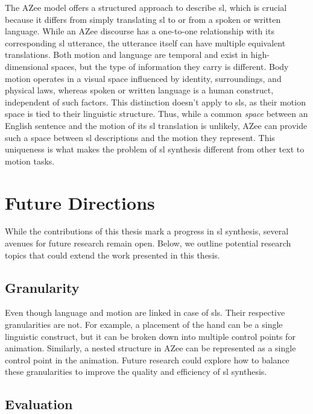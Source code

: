 \documentclass[../../main.tex]{subfiles}
\begin{document}
The AZee model offers a structured approach to describe \gls{sl}, which is crucial because it differs from simply translating \gls{sl} to or from a spoken or written language. While an AZee discourse has a one-to-one relationship with its corresponding \gls{sl} utterance, the utterance itself can have multiple equivalent translations. Both motion and language are temporal and exist in high-dimensional spaces, but the type of information they carry is different. Body motion operates in a visual space influenced by identity, surroundings, and physical laws, whereas spoken or written language is a human construct, independent of such factors. This distinction doesn't apply to \gls{sl}s, as their motion space is tied to their linguistic structure. Thus, while a common \emph{space} between an English sentence and the motion of its \gls{sl} translation is unlikely, AZee can provide such a space between \gls{sl} descriptions and the motion they represent. This uniqueness is what makes the problem of \gls{sl} synthesis different from other text to motion tasks.

\section{Future Directions}
\label{ch:conclusion:future}

While the contributions of this thesis mark a progress in \gls{sl} synthesis, several avenues for future research remain open. Below, we outline potential research topics that could extend the work presented in this thesis.

\subsection{Granularity}
\label{ch:conclusion:future:granularity}

Even though language and motion are linked in case of \gls{sl}s. Their respective granularities are not. For example, a placement of the hand can be a single linguistic construct, but it can be broken down into multiple control points for animation. Similarly, a nested structure in AZee can be represented as a single control point in the animation. Future research could explore how to balance these granularities to improve the quality and efficiency of \gls{sl} synthesis.

\subsection{Evaluation}
\label{ch:conclusion:future:evaluation}
\end{document}
